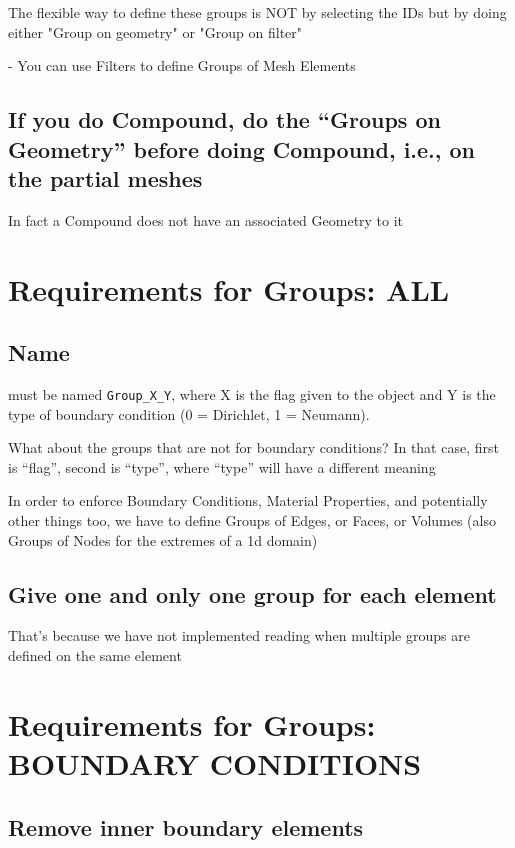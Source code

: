 \documentclass[10pt]{book}
\begin{document}
    The flexible way to define these groups is NOT by selecting the IDs but by doing either "Group on geometry" or "Group on filter"

- You can use Filters to define Groups of Mesh Elements

        
  \subsection{If you do Compound, do the ``Groups on Geometry'' before doing Compound, i.e., on the partial meshes}         
          
  In fact a Compound does not have an associated Geometry to it
        
          
\section{Requirements for Groups: ALL}


\subsection{Name}

  must be named \verb|Group_X_Y|, where X is the flag given to the object and Y is the type of boundary condition (0 = Dirichlet, 1 = Neumann).
  
  
  What about the groups that are not for boundary conditions? In that case, first is ``flag'', second is ``type'', where ``type'' will have
  a different meaning

  In order to enforce Boundary Conditions, Material Properties, and potentially other things too,
  we have to define Groups of Edges, or Faces, or Volumes (also Groups of Nodes for the extremes of a 1d domain)
  


\subsection{Give one and only one group for each element}

 That's because we have not implemented reading when multiple groups are defined on the same element

\section{Requirements for Groups: BOUNDARY CONDITIONS}

   
\subsection{Remove inner boundary elements}
\end{document}
